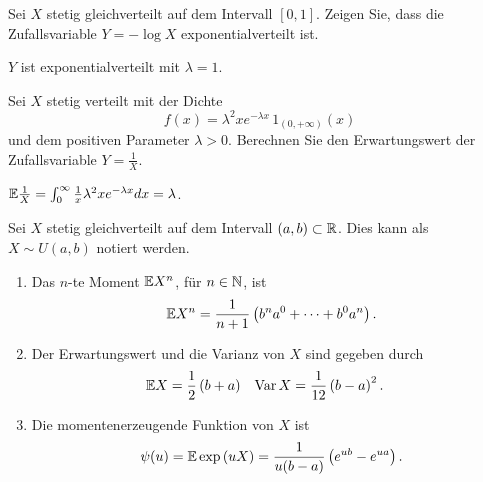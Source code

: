 Sei $X$ stetig gleichverteilt auf dem Intervall $[0,1]$. Zeigen Sie, dass die
Zufallsvariable $Y = -\log X$ exponentialverteilt ist.

\solution $Y$ ist exponentialverteilt mit $\lambda=1$.

Sei $X$ stetig verteilt mit der Dichte \[f(x) = \lambda^{2} x e^{-\lambda x}\,
1_{(0,+\infty)}(x)\] und dem positiven Parameter $\lambda>0$.  Berechnen Sie
den Erwartungswert der Zufallsvariable $Y = \frac{1}{X}$.

\solution
$\mathbb{E} \frac{1}{X} = \int_{0}^{\infty} \frac{1}{x} \lambda^{2} x e^{-\lambda x} dx = \lambda$.

Sei $X$ stetig gleichverteilt auf dem Intervall $\left( a,b \right)\subset \mathbb{R}$.  
Dies kann als $X \sim U(a,b)$ notiert werden. 
\begin{enumerate}
    \item Das $n$-te Moment $\mathbb{E} X^{n}$, für $n\in\mathbb N$, ist 
        \begin{equation*}
            \mathbb{E} X^n = \frac{1}{n+1}\left( b^{n}a^0 + \cdots + b^{0}a^{n} \right).
        \end{equation*}
    \item Der Erwartungswert und die Varianz von $X$ sind gegeben durch
        \begin{align*}
            \mathbb{E} X    & = \frac{1}{2} \left( b+a \right) & 
            \operatorname{Var} X  & = \frac{1}{12} \left( b-a \right)^{2}.  
        \end{align*}
    \item Die momentenerzeugende Funktion von $X$ ist 
        \begin{equation*}
            \psi(u) = \mathbb{E} \exp \left( u X \right) = \frac{1}{u(b-a)}\left( e^{ub} - e^{ua} \right).
        \end{equation*}
\end{enumerate}

